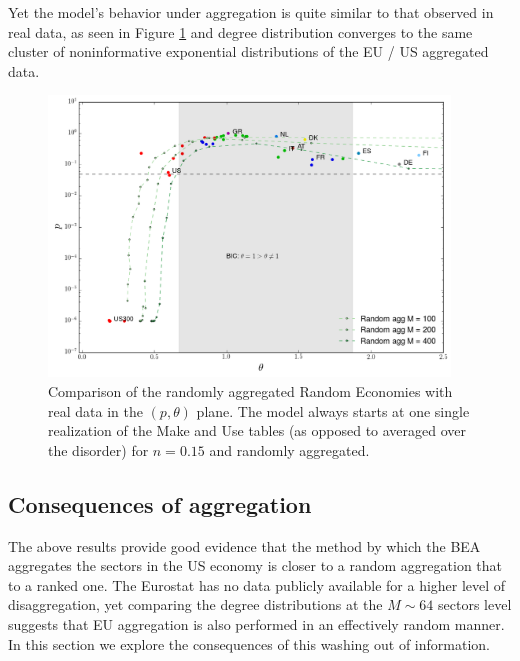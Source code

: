 Yet the model's behavior under aggregation is quite similar to
that observed in real data, as seen in Figure
\ref{fig:theta_pval_model_agg} and degree distribution converges to
the same cluster of noninformative exponential distributions of the EU
/ US aggregated data.

\begin{figure}[!ht]
  \centering
  \includegraphics[width=0.95\textwidth]{figs_io/theta_pval_model_agg.png}
  \caption{Comparison of the randomly aggregated Random Economies with real data in the
    $(p, \theta)$ plane. The model always starts at one single
    realization of the Make and Use tables (as opposed to averaged
    over the disorder) for $n=0.15$ and randomly aggregated.}
  \label{fig:theta_pval_model_agg}
\end{figure}


\subsection{Consequences of aggregation}

The above results provide good evidence that the method by which the
BEA aggregates the sectors in the US economy is closer to a random
aggregation that to a ranked one. The Eurostat has no data publicly
available for a higher level of disaggregation, yet comparing the
degree distributions at the $M\sim 64$ sectors level suggests that EU
aggregation is also performed in an effectively random manner. In this
section we explore the consequences of this washing out of
information.


